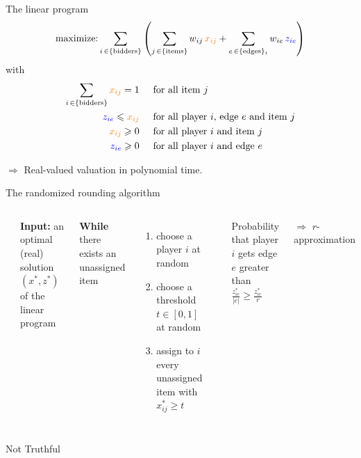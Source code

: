 \documentclass[aspectratio=169]{beamer}
\begin{document}
\begin{frame}{The linear program}
    \[
        \text{maximize:} \sum_{i \,\in \{\text{bidders}\}} \left(
            \sum_{j \,\in \{\text{items}\}} w_{ij}\, {\color{orange} x_{ij}}
            + \sum_{e \,\in \{\text{edges}\}_i} w_{ie}\, {\color{blue} z_{ie}}
        \right)
    \]
    with
    \begin{align*}
        \sum_{i \,\in \{\text{bidders}\}} {\color{orange} x_{ij}}  = 1 & \hspace{.5cm} \text{for all item \(j\)}\\
        {\color{blue} z_{ie}}  \leqslant {\color{orange} x_{ij}} & \hspace{.5cm} \text{for all player \(i\), edge \(e\) and item \(j\)}\\
        {\color{orange} x_{ij}}   \geqslant 0 & \hspace{.5cm} \text{for all player \(i\) and item \(j\)}\\
        {\color{blue} z_{ie}}  \geqslant 0 & \hspace{.5cm} \text{for all player \(i\) and edge \(e\)}
    \end{align*}

    $\Rightarrow$ Real-valued valuation in \alert{polynomial time}.
\end{frame}

\begin{frame}{The randomized rounding algorithm}
    \begin{columns}
        \hrule
        \vspace{.1cm}
        \textbf{Input:} an optimal (real) solution \((x^*, z^*)\) of the linear program

        \vspace{.65cm}
        \textbf{While} there exists an unassigned item
        \begin{enumerate}
            \item choose a player \(i\) at random
            \item choose a threshold \(t \in [0, 1]\) at random
            \item assign to \(i\) every unassigned item with \(x_{ij}^* \geqslant t\)
        \end{enumerate}
        \hrule

        Probability that player \(i\) gets edge \(e\) greater than \(\frac{z_{ie}^*}{|e|} \geqslant \frac{z_{ie}^*}{r}\)

        \(\Rightarrow\) \(r\)-approximation

    \end{columns}
    \pause
    \begin{center}
        \alert<2>{Not Truthful}
    \end{center}
\end{frame}
\end{document}
